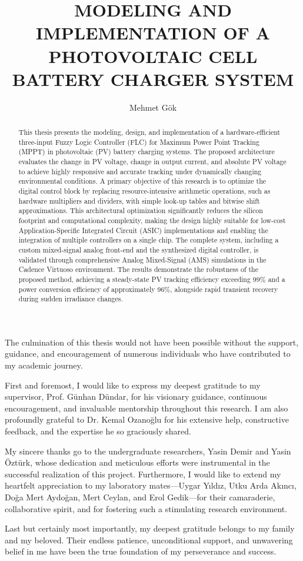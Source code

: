 \documentclass[a4paper,oneside,12pt]{report}
\title{MODELING AND IMPLEMENTATION OF A PHOTOVOLTAIC CELL BATTERY CHARGER SYSTEM}
\author{Mehmet Gök}
\numberwithin{equation}{chapter}
\begin{document}
\makemstitle %
\makeapprovalpage

\begin{acknowledgements}
The culmination of this thesis would not have been possible without the support, guidance, and encouragement of numerous individuals who have contributed to my academic journey.

First and foremost, I would like to express my deepest gratitude to my supervisor, Prof. Günhan Dündar, for his visionary guidance, continuous encouragement, and invaluable mentorship throughout this research. I am also profoundly grateful to Dr. Kemal Ozanoğlu for his extensive help, constructive feedback, and the expertise he so graciously shared.

My sincere thanks go to the undergraduate researchers, Yasin Demir and Yasin Öztürk, whose dedication and meticulous efforts were instrumental in the successful realization of this project. Furthermore, I would like to extend my heartfelt appreciation to my laboratory mates---Uygar Yıldız, Utku Arda Akıncı, Doğa Mert Aydoğan, Mert Ceylan, and Erol Gedik---for their camaraderie, collaborative spirit, and for fostering such a stimulating research environment.

Last but certainly most importantly, my deepest gratitude belongs to my family and my beloved. Their endless patience, unconditional support, and unwavering belief in me have been the true foundation of my perseverance and success.
\end{acknowledgements}

\begin{abstract}
This thesis presents the modeling, design, and implementation of a hardware-efficient three-input Fuzzy Logic Controller (FLC) for Maximum Power Point Tracking (MPPT) in photovoltaic (PV) battery charging systems. The proposed architecture evaluates the change in PV voltage, change in output current, and absolute PV voltage to achieve highly responsive and accurate tracking under dynamically changing environmental conditions. A primary objective of this research is to optimize the digital control block by replacing resource-intensive arithmetic operations, such as hardware multipliers and dividers, with simple look-up tables and bitwise shift approximations. This architectural optimization significantly reduces the silicon footprint and computational complexity, making the design highly suitable for low-cost Application-Specific Integrated Circuit (ASIC) implementations and enabling the integration of multiple controllers on a single chip. The complete system, including a custom mixed-signal analog front-end and the synthesized digital controller, is validated through comprehensive Analog Mixed-Signal (AMS) simulations in the Cadence Virtuoso environment. The results demonstrate the robustness of the proposed method, achieving a steady-state PV tracking efficiency exceeding 99\% and a power conversion efficiency of approximately 96\%, alongside rapid transient recovery during sudden irradiance changes.
\end{abstract}
\end{document}
